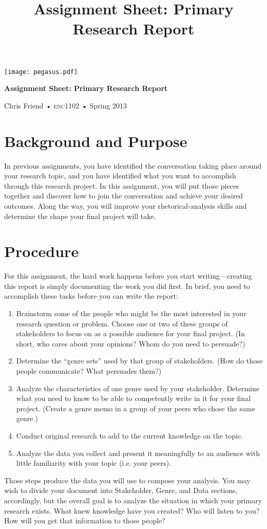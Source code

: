 \documentclass[11pt, twosides]{amsart}	%
\title[Primary Research Report]{Assignment Sheet: Primary Research Report}
\begin{document}
%
\thispagestyle{empty}

\vspace{-2in}
\begin{center}
\huge
\texttt{[image: pegasus.pdf]}

\textbf{Assignment Sheet: Primary Research Report}

{\normalsize Chris Friend • \textsc{enc1102} • Spring 2013}
\end{center}
\vspace{1.5\baselineskip}

\section{Background and Purpose} %
\label{sec:background}
In previous assignments, you have identified the conversation taking place around your research topic, and you have identified what you want to accomplish through this research project. In this assignment, you will put those pieces together and discover how to join the conversation and achieve your desired outcomes. Along the way, you will improve your rhetorical-analysis skills and determine the shape your final project will take.

\section{Procedure} %
\label{sec:procedure}
For this assignment, the hard work happens before you start writing---creating this report is simply documenting the work you did first. In brief, you need to accomplish these tasks before you can write the report:
\begin{enumerate}
	\item Brainstorm some of the people who might be the most interested in your research question or problem. Choose one or two of these groups of stakeholders to focus on as a possible audience for your final project. (In short, who cares about your opinions? Whom do you need to persuade?)
	\item Determine the “genre sets” used by that group of stakeholders. (How do those people communicate? What persuades them?)
	\item Analyze the characteristics of one genre used by your stakeholder. Determine what you need to know to be able to competently write in it for your final project. (Create a genre memo in a group of your peers who chose the same genre.)
	\item Conduct original research to add to the current knowledge on the topic.
	\item Analyze the data you collect and present it meaningfully to an audience with little familiarity with your topic (i.e. your peers).
\end{enumerate}
Those steps produce the data you will use to compose your analysis. You may wish to divide your document into Stakeholder, Genre, and Data sections, accordingly, but the overall goal is to analyze the situation in which your primary research exists. What knew knowledge have you created? Who will listen to you? How will you get that information to those people?
\end{document}
